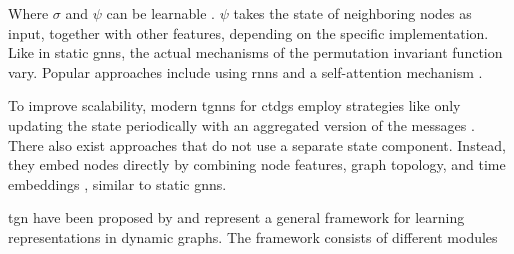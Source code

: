 Where $\sigma$ and $\psi$ can be learnable \cite{rossi_temporal_2020}. $\psi$ takes the state of neighboring nodes as input, together with other features, depending on the specific implementation. Like in static \glspl{gnn}, the actual mechanisms of the permutation invariant function vary. Popular approaches include using \glspl{rnn} \cite{ma_streaming_2018} and a self-attention mechanism \cite{rossi_temporal_2020}.

To improve scalability, modern \glspl{tgnn} for \glspl{ctdg} employ strategies like only updating the state periodically with an aggregated version of the messages \cite{rossi_temporal_2020}. There also exist approaches that do not use a separate state component. Instead, they embed nodes directly by combining node features, graph topology, and time embeddings \cite{longa_graph_2023, xu_inductive_2020}, similar to static \glspl{gnn}.




\iffalse
\gls{tgn} have been proposed by \cite{rossi_temporal_2020} and represent a general framework for learning representations in dynamic graphs. The framework consists of different modules


